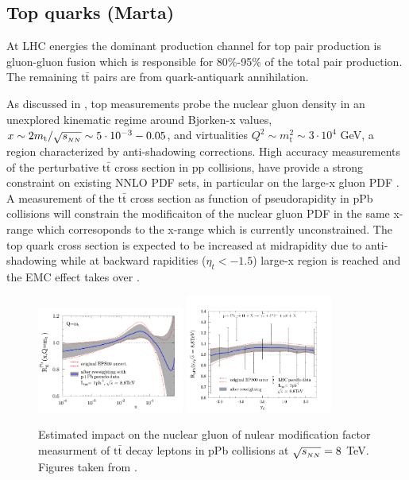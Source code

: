 \subsection{Top quarks (Marta)}
At LHC energies the dominant production channel for top pair production is gluon-gluon fusion which is responsible for 80\%-95\% of the total pair production. The remaining $\mathrm{t}\bar{\mathrm{t}}$ pairs are from quark-antiquark annihilation. 

As discussed in \cite{d'Enterria:2015jna}, top measurements probe the nuclear gluon density in an unexplored kinematic regime around Bjorken-x values, $x \sim 2m_{\mathrm{t}}/\sqrt{s_{_{NN}}} \sim 5 \cdot 10^{-3}-0.05$, and virtualities $Q^{2} \sim m_{\mathrm{t}}^{2} \sim 3 \cdot 10^{4}$ GeV, a region characterized by anti-shadowing corrections. High accuracy measurements of the perturbative $\mathrm{t}\bar{\mathrm{t}}$ cross section in pp collisions, have provide a strong constraint on existing NNLO PDF sets, in particular on the large-x gluon PDF \cite{Czakon:2013tha}. A measurement of the $\mathrm{t}\bar{\mathrm{t}}$ cross section as function of pseudorapidity in pPb collisions will constrain the modificaiton of the nuclear gluon PDF in the same x-range which corresoponds to the x-range which is currently unconstrained. The top quark cross section is expected to be increased at midrapidity due to anti-shadowing while at backward rapidities ($\eta_{t}<-1.5$) large-x region is reached and the EMC effect takes over \cite{d'Enterria:2015jna}.
\begin{figure}[h!]
\begin{center}
  \includegraphics[width= 0.43\textwidth]{figures/top/gluons2.png}
  \includegraphics[width= 0.43\textwidth]{figures/top/data2.png}
  \caption{Estimated impact on the nuclear gluon of nulear modification factor measurment of $\mathrm{t}\bar{\mathrm{t}}$ decay leptons in pPb collisions at $\sqrt{s_{_{NN}}}=8$ TeV. Figures taken from \cite{d'Enterria:2015jna}.
  }
\label{fig:ttnPDF}
\end{center}
\end{figure}

